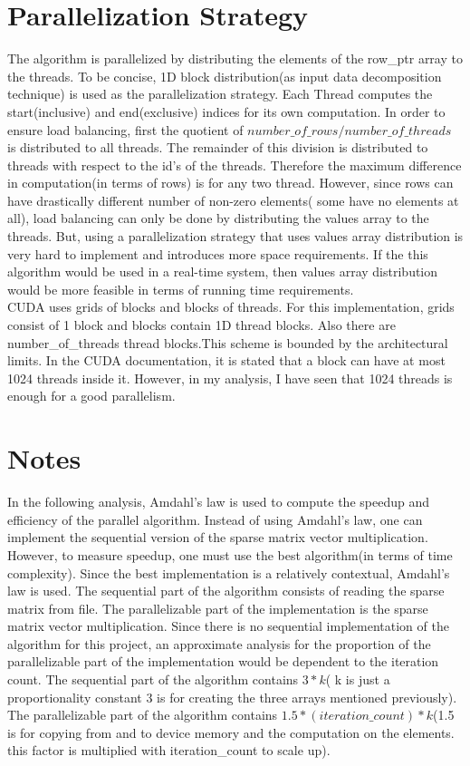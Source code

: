 \documentclass{article}
\begin{document}
\section{Parallelization Strategy} 
\qquad The algorithm is parallelized by distributing the elements of the row\_ptr array to the threads. To be concise, 1D block distribution(as input data decomposition technique) is used as the parallelization strategy. Each Thread computes the start(inclusive) and end(exclusive) indices for its own computation. In order to ensure load balancing, first the quotient of $number\_of\_rows / number\_of\_threads$ is distributed to all threads. The remainder of this division is distributed to threads with respect to the id's of the threads. Therefore the maximum difference in computation(in terms of rows) is for any two thread. However, since rows can have drastically different number of non-zero elements( some have no elements at all), load balancing can only be done by distributing the values array to the threads. But, using a parallelization strategy that uses values array distribution is very hard to implement and introduces more space requirements. If the this algorithm would be used in a real-time system, then values array distribution would be more feasible in terms of running time requirements.\\
\null \qquad CUDA uses grids of blocks and blocks of threads. For this implementation, grids consist of 1 block and blocks contain 1D thread blocks. Also there are number\_of\_threads thread blocks.This scheme is bounded by the architectural limits. In the CUDA documentation, it is stated that a block can have at most 1024 threads inside it. However, in my analysis, I have seen that 1024 threads is enough for a good parallelism.\\

\section{Notes} 
\qquad In the following analysis, Amdahl's law is used to compute the speedup and efficiency of the parallel algorithm. Instead of using Amdahl's law, one can implement the sequential version of the sparse matrix vector multiplication. However, to measure speedup, one must use the best algorithm(in terms of time complexity). Since the best implementation is a relatively contextual, Amdahl's law is used. The sequential part of the algorithm consists of reading the sparse matrix from file. The parallelizable part of the implementation is the sparse matrix vector multiplication. Since there is no sequential implementation of the algorithm for this project, an approximate analysis for the proportion of the parallelizable part of the  implementation would be dependent to the iteration count. The sequential part of the algorithm contains $ 3 * k$( k is just a proportionality constant 3 is for creating the three arrays mentioned previously). The parallelizable part of the algorithm contains $ 1.5 * (iteration\_count) * k$(1.5 is for copying from and to device memory and the computation on the elements. this factor is multiplied with iteration\_count to scale up).
\end{document}
